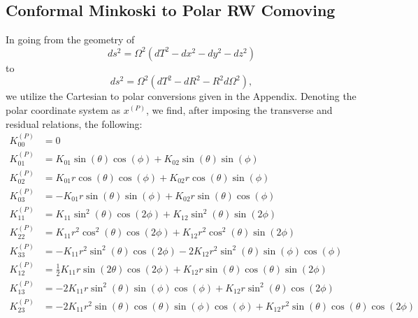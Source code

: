 \documentclass[10pt,letterpaper]{article}
\begin{document}
\subsection*{Conformal Minkoski to Polar RW Comoving}
In going from the geometry of 
\begin{equation}
ds^2 = \Omega^2(dT^2 - dx^2-dy^2-dz^2)
\end{equation}
to
\begin{equation}
ds^2 = \Omega^2 (dT^2-dR^2 - R^2 d\Omega^2),
\end{equation}
we utilize the Cartesian to polar conversions given in the Appendix. Denoting the polar coordinate system as $x^{(P)}$, we find, after imposing the transverse and residual relations, the following:
\begin{align}
K^{(P)}_{00} &= 0\nonumber\\
K^{(P)}_{01} &= K_{01} \sin (\theta ) \cos (\phi )+K_{02} \sin (\theta ) \sin (\phi )\nonumber\\
K^{(P)}_{02} &= K_{01} r \cos (\theta ) \cos (\phi )+K_{02} r \cos (\theta ) \sin (\phi )\nonumber\\
K^{(P)}_{03} &= -K_{01} r \sin (\theta ) \sin (\phi )+K_{02} r \sin (\theta ) \cos (\phi )\nonumber\\
K^{(P)}_{11} &= K_{11} \sin ^2(\theta ) \cos (2 \phi )+K_{12} \sin ^2(\theta ) \sin (2 \phi )\nonumber\\
K^{(P)}_{22} &= K_{11} r^2 \cos ^2(\theta ) \cos (2 \phi )+K_{12} r^2 \cos ^2(\theta ) \sin (2 \phi )\nonumber\\
K^{(P)}_{33} &= -K_{11} r^2 \sin ^2(\theta ) \cos (2 \phi )-2 K_{12} r^2 \sin ^2(\theta ) \sin (\phi ) \cos (\phi )\nonumber\\
K^{(P)}_{12} &= \frac{1}{2} K_{11} r \sin (2 \theta ) \cos (2 \phi )+K_{12} r \sin (\theta ) \cos (\theta ) \sin (2 \phi )\nonumber\\
K^{(P)}_{13} &=-2 K_{11} r \sin ^2(\theta ) \sin (\phi ) \cos (\phi )+ K_{12} r \sin ^2(\theta ) \cos (2 \phi )\nonumber\\
K^{(P)}_{23} &= -2 K_{11} r^2 \sin (\theta ) \cos (\theta ) \sin (\phi ) \cos (\phi )+K_{12} r^2 \sin (\theta ) \cos (\theta ) \cos (2 \phi )
\end{align}
\end{document}
